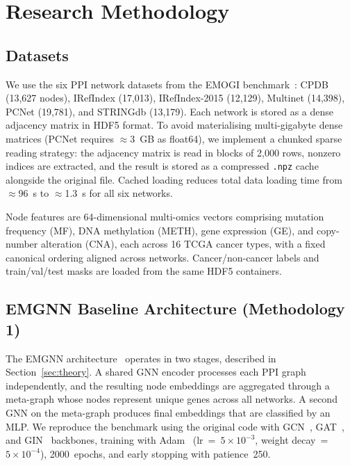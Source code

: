 
\section{Research Methodology}

\subsection{Datasets}

We use the six PPI network datasets from the EMOGI benchmark~\cite{emogi2021}:
CPDB (13,627 nodes), IRefIndex (17,013), IRefIndex-2015 (12,129), Multinet (14,398),
PCNet (19,781), and STRINGdb (13,179). Each network is stored as a dense adjacency matrix
in HDF5 format. To avoid materialising multi-gigabyte dense matrices (PCNet requires
$\approx$3~GB as float64), we implement a chunked sparse reading strategy: the adjacency
matrix is read in blocks of 2,000 rows, nonzero indices are extracted, and the result is
stored as a compressed \texttt{.npz} cache alongside the original file. Cached loading
reduces total data loading time from $\approx$96~s to $\approx$1.3~s for all six networks.

Node features are 64-dimensional multi-omics vectors comprising mutation frequency (MF),
DNA methylation (METH), gene expression (GE), and copy-number alteration (CNA), each
across 16 TCGA cancer types, with a fixed canonical ordering aligned across networks.
Cancer/non-cancer labels and train/val/test masks are loaded from the same HDF5 containers.

\subsection{EMGNN Baseline Architecture (Methodology 1)}

The EMGNN architecture~\cite{emgnn2023} operates in two stages, described in
Section~\ref{sec:theory}. A shared GNN encoder processes each PPI graph independently,
and the resulting node embeddings are aggregated through a meta-graph whose nodes represent
unique genes across all networks. A second GNN on the meta-graph produces final embeddings
that are classified by an MLP. We reproduce the benchmark using the original code with
GCN~\cite{gcn2017}, GAT~\cite{gat2018}, and GIN~\cite{gin2019} backbones, training with
Adam~\cite{kingma2014adam} (lr~=~$5\times10^{-3}$, weight decay~=~$5\times10^{-4}$),
2000~epochs, and early stopping with patience~250.

